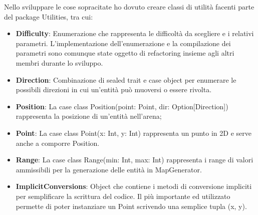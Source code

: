Nello sviluppare le cose sopracitate ho dovuto creare classi di utilità facenti parte del package Utilities, tra cui:
\begin{itemize}
    \item \textbf{Difficulty}: Enumerazione che rappresenta le difficoltà da scegliere e i relativi parametri. L'implementazione dell'enumerazione e la compilazione dei parametri sono comunque state oggetto di refactoring insieme agli altri membri durante lo sviluppo.
    \item \textbf{Direction}: Combinazione di sealed trait e case object per enumerare le possibili direzioni in cui un'entità può muoversi o essere rivolta.
    \item \textbf{Position}: La case class Position(point: Point, dir: Option[Direction]) rappresenta la posizione di un'entità nell'arena;
    \item \textbf{Point}: La case class Point(x: Int, y: Int) rappresenta un punto in 2D e serve anche a comporre Position.
    \item \textbf{Range}: La case class Range(min: Int, max: Int) rappresenta i range di valori ammissibili per la generazione delle entità in MapGenerator.
    \item \textbf{ImplicitConversions}: Object che contiene i metodi di conversione impliciti per semplificare la scrittura del codice. Il più importante ed utilizzato permette di poter instanziare un Point scrivendo una semplice tupla (x, y).
\end{itemize}